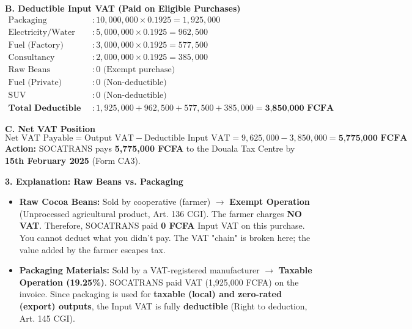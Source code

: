 \documentclass[11pt]{article}
\begin{document}
\begin{exoresolu}
\textbf{B. Deductible Input VAT (Paid on Eligible Purchases)}
\begin{align*}
\text{Packaging} &: 10,000,000 \times 0.1925 = 1,925,000 \\
\text{Electricity/Water} &: 5,000,000 \times 0.1925 = 962,500 \\
\text{Fuel (Factory)} &: 3,000,000 \times 0.1925 = 577,500 \\
\text{Consultancy} &: 2,000,000 \times 0.1925 = 385,000 \\
\text{Raw Beans} &: 0 \text{ (Exempt purchase)} \\
\text{Fuel (Private)} &: 0 \text{ (Non-deductible)} \\
\text{SUV} &: 0 \text{ (Non-deductible)} \\
\textbf{Total Deductible Input VAT} &: 1,925,000 + 962,500 + 577,500 + 385,000 = \textbf{3,850,000 FCFA}
\end{align*}

\textbf{C. Net VAT Position}
\[
\text{Net VAT Payable} = \text{Output VAT} - \text{Deductible Input VAT} = 9,625,000 - 3,850,000 = \textbf{5,775,000 FCFA}
\]
\textbf{Action:} SOCATRANS pays \textbf{5,775,000 FCFA} to the Douala Tax Centre by \textbf{15th February 2025} (Form CA3).

\textbf{3. Explanation: Raw Beans vs. Packaging}
\begin{itemize}
    \item \textbf{Raw Cocoa Beans:} Sold by cooperative (farmer) $\rightarrow$ \textbf{Exempt Operation} (Unprocessed agricultural product, Art. 136 CGI). The farmer charges \textbf{NO VAT}. Therefore, SOCATRANS paid \textbf{0 FCFA} Input VAT on this purchase. You cannot deduct what you didn't pay. The VAT "chain" is broken here; the value added by the farmer escapes tax.
    \item \textbf{Packaging Materials:} Sold by a VAT-registered manufacturer $\rightarrow$ \textbf{Taxable Operation (19.25\%)}. SOCATRANS paid VAT (1,925,000 FCFA) on the invoice. Since packaging is used for \textbf{taxable (local) and zero-rated (export) outputs}, the Input VAT is fully \textbf{deductible} (Right to deduction, Art. 145 CGI).
\end{itemize}
\end{exoresolu}
\end{document}
